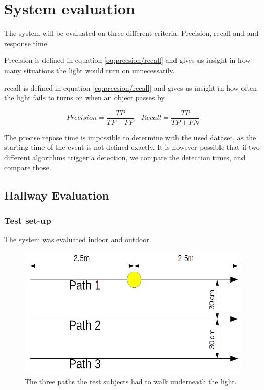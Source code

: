 \chapter{System evaluation}
\label{System_evaluation}
The system will be evaluated on three different criteria: Precision, recall and and response time.

Precision is defined in equation \ref{eq:precsion/recall} and gives us insight in how many situations the light would turn on unnecessarily.

recall is defined in equation \ref{eq:precsion/recall} and gives us insight in how often the light fails to turns on when an object passes by. 

\begin{equation}
\label{eq:precsion/recall}
Precision = \frac{TP}{TP + FP}
\quad
Recall = \frac{TP}{TP + FN}
\end{equation}

The precise repose time is impossible to determine with the used dataset, as the starting time of the event is not defined exactly. It is however possible that if two different algorithms trigger a detection, we compare the detection times, and compare those.

\section{Hallway Evaluation}

\subsection{Test set-up}
The system was evaluated indoor and outdoor. 

\begin{figure}
	\includegraphics[width=\textwidth]{pics/Evaluation_paths.png}
	\caption{The three paths the test subjects had to walk underneath the light.}
	\label{fig:Evaluation_paths}
\end{figure}

